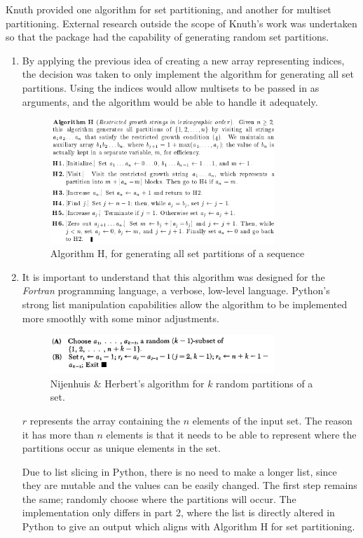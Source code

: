 \documentclass[12pt]{article}
\begin{document}
Knuth provided one algorithm for set partitioning, and another for multiset partitioning. External research outside the scope of Knuth's work was undertaken so that the package had the capability of generating random set partitions.

\begin{enumerate}
\item By applying the previous idea of creating a new array representing indices, the decision was taken to only implement the algorithm for generating all set partitions. Using the indices would allow multisets to be passed in as arguments, and the algorithm would be able to handle it adequately.
    
\begin{figure}[h]
\centering
\includegraphics[width=0.8\textwidth]{images/set_part_H.PNG}
\caption{Algorithm H, for generating all set partitions of a sequence \cite{set_part_H}}
\end{figure}
    
\pagebreak
    
\item It is important to understand that this algorithm was designed for the \textit{Fortran} programming language, a verbose, low-level language. Python's strong list manipulation capabilities allow the algorithm to be implemented more smoothly with some minor adjustments. 

\begin{figure}[h]
\centering
\includegraphics[width=0.8\textwidth]{images/rand_set_part.PNG}
\caption{Nijenhuis \& Herbert's algorithm for \(k\) random partitions of a set. \cite{rand_set_part}}
\end{figure}

\(r\) represents the array containing the \(n\) elements of the input set. The reason it has more than \(n\) elements is that it needs to be able to represent where the partitions occur as unique elements in the set. 

Due to list slicing in Python, there is no need to make a longer list, since they are mutable and the values can be easily changed. The first step remains the same; randomly choose where the partitions will occur. The implementation only differs in part 2, where the list is directly altered in Python to give an output which aligns with Algorithm H for set partitioning.

\end{enumerate}
\end{document}
